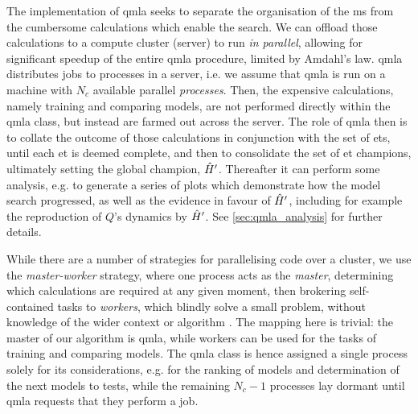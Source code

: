 The implementation of \gls{qmla} seeks to separate the organisation of the \gls{ms} from the 
    cumbersome calculations which enable the search. 
We can offload those calculations to a compute cluster (server) to run \emph{in parallel},
    allowing for significant speedup of the entire \gls{qmla} procedure, 
    limited by Amdahl's law. %
\gls{qmla} distributes jobs to  processes in a server, 
    i.e. we assume that \gls{qmla} is run on a machine with $N_c$ available parallel \emph{processes}\footnotemark. 
Then, the expensive calculations, namely training and comparing models, are not performed 
    directly within the \gls{qmla} class, but instead are farmed out across the server.
The role of \gls{qmla} then is to collate the outcome of those calculations in conjunction with the set of \glspl{et}, 
    until each \gls{et} is deemed complete, and then to consolidate the set of 
    \gls{et} champions, ultimately setting the global champion, $\hat{H}^{\prime}$. 
Thereafter it can perform some analysis, e.g. to generate a series of plots which demonstrate how the 
    model search progressed, as well as the evidence in favour of $\hat{H}^{\prime}$, including for example 
    the reproduction of $Q$'s dynamics by $\hat{H}^{\prime}$. 
See \cref{sec:qmla_analysis} for further details. 

\par 

While there are a number of strategies for parallelising code over a cluster, 
    we use the \emph{master-worker} strategy, where one process acts as the \emph{master}, 
    determining which calculations are required at any given moment, 
    then brokering self-contained tasks to \emph{workers}, 
    which blindly solve a small problem, without knowledge of the wider context or algorithm \cite{hockney2019parallel}.
The mapping here is trivial: the master of our algorithm is \gls{qmla}, 
    while workers can be used for the tasks of training and comparing models. 
The \gls{qmla} class is hence assigned a single process solely for its considerations, 
    e.g. for the ranking of models and determination of the next models to tests, 
    while the remaining $N_c - 1$ processes lay dormant until \gls{qmla} requests that they perform a job. 


